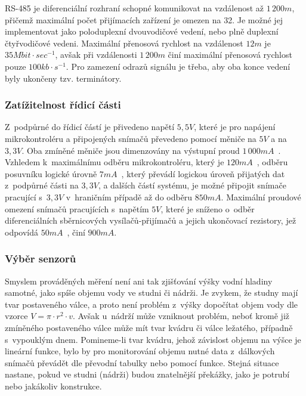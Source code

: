                 RS-485 je diferenciální rozhraní schopné komunikovat na vzdálenost až $1\,200\unit{m}$, přičemž maximální počet přijímacích zařízení je omezen na 32. Je možné jej implementovat jako poloduplexní dvouvodičové vedení, nebo plně duplexní čtyřvodičové vedeni.
                Maximální přenosová rychlost na vzdálenost $12\unit{m}$ je $35\unit{Mbit \cdot sec^{-1}}$, avšak při vzdálenosti $1\,200\unit{m}$ činí maximální přenosová rychlost pouze $100\unit{kb\cdot s^{-1}}$. Pro zamezení odrazů signálu je třeba, aby oba konce vedení byly ukončeny tzv. terminátory.~\cite{book:elec} 

            \subsubsection{Zatížitelnost řídicí části}
                Z~podpůrné do řídicí částí je přivedeno napětí $5,5\unit{V}$, které je pro napájení mikrokontroléru a připojených snímačů převedeno pomocí měniče  na $5\unit{V}$ a  na $3,3\unit{V}$. Oba zmíněné měniče jsou dimenzovány na výstupní proud $1\,000\unit{mA}$~\cite{io:mcp}. Vzhledem k~maximálnímu odběru mikrokontroléru, který je $120\unit{mA}$~\cite{stm:datasheet}, odběru posuvníku logické úrovně  $7\unit{mA}$~\cite{io:sn74}, který převádí logickou úroveň přijatých dat z~podpůrné části na $3,3\unit{V}$, a dalších částí systému, je možné připojit snímače pracující s~$3,3\unit{V}$ v~hraničním případě až do odběru $850\unit{mA}$. Maximální proudové omezení snímačů pracujících s~napětím $5\unit{V}$, které je sníženo o~odběr diferenciálních sběrnicových vysílačů-přijímačů  a jejich ukončovací rezistory, jež odpovídá $50\unit{mA}$~\cite{io:sn75}, činí $900\unit{mA}$. 

        \subsubsection{Výběr senzorů}
            \label{sec:sensors}

            Smyslem prováděných měření není ani tak zjišťování výšky vodní hladiny samotné, jako spíše objemu vody ve studni či nádrži. Je zvykem, že studny mají tvar postaveného válce, a proto není problém z~výšky dopočítat objem vody dle vzorce $V = \pi \cdot r^2 \cdot v$. Avšak u~nádrží může vzniknout problém, neboť kromě již zmíněného postaveného válce může mít tvar kvádru či válce ležatého, případně s~vypouklým dnem. Pomineme-li tvar kvádru, jehož závislost objemu na výšce je lineární funkce, bylo by pro monitorování objemu nutné data z~dálkových snímačů převádět dle převodní tabulky nebo pomocí funkce. Stejná situace nastane, pokud ve studni (nádrži) budou znatelnější překážky, jako je potrubí nebo jakákoliv konstrukce.

